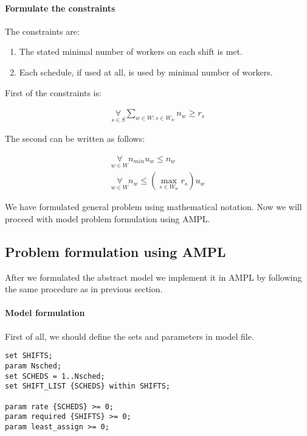 \paragraph{Formulate the constraints}

The constraints are:

\begin{enumerate}
  \item The stated minimal number of workers on each shift is met.
  \item Each schedule, if used at all, is used by minimal number of workers.
\end{enumerate}

First of the constraints is: 

\begin{align}
   \mathop\forall\limits_{s \in S}
     \mathop\sum\limits_{w \in W: s \in W_w} n_w \geq r_s
\end{align}

The second can be written as follows:

\begin{align}
   \mathop\forall\limits_{w \in W}
     n_{min} u_w \leq n_w \\
   \mathop\forall\limits_{w \in W}
     n_w \leq \left(\max\limits_{s \in W_w} r_s\right) u_w 
\end{align}

We have formulated general problem using mathematical notation. Now we will proceed with model problem formulation using AMPL.

\subsection{Problem formulation using AMPL}

After we formulated the abstract model we implement it in AMPL by following the same procedure as in previous section. 

\paragraph{Model formulation}

First of all, we should define the sets and parameters in model file.

\begin{lstlisting}
set SHIFTS;
param Nsched;
set SCHEDS = 1..Nsched;
set SHIFT_LIST {SCHEDS} within SHIFTS;

param rate {SCHEDS} >= 0;
param required {SHIFTS} >= 0;
param least_assign >= 0;
\end{lstlisting}

